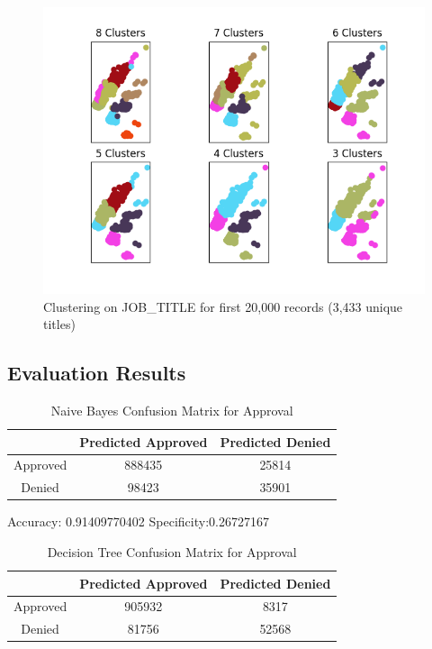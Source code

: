 \documentclass[sigconf]{acmart}
\begin{document}
\begin{figure}[ht]
  \centering
  \includegraphics[]{clustering}
  \caption{Clustering on JOB\_TITLE for first 20,000 records (3,433 unique titles)}
\end{figure}

\subsection{Evaluation Results}

\begin{table}[h]
    \caption{Naive Bayes Confusion Matrix for Approval}
    \centering
    \begin{tabular}{c| c |c}
        &Predicted Approved&Predicted Denied\\
        \hline
        Approved& 888435& 25814\\
        Denied  & 98423 & 35901\\
    \end{tabular}
\end{table}

Accuracy: 0.91409770402 \qquad Specificity:0.26727167


\begin{table}[h]
    \caption{Decision Tree Confusion Matrix for Approval}
    \centering
    \begin{tabular}{c| c |c}
        &Predicted Approved&Predicted Denied\\
        \hline
        Approved& 905932& 8317\\
        Denied  & 81756 & 52568\\
    \end{tabular}
\end{table}
\end{document}
